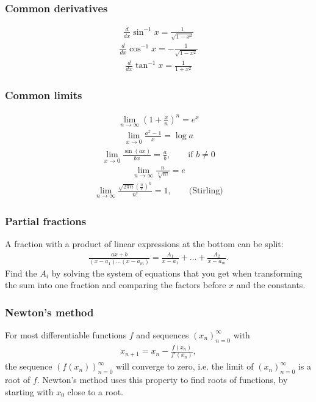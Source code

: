 \subsubsection{Common derivatives}
\begin{align*}
    \frac{d}{dx}\sin^{-1}x = \frac1{\sqrt{1-x^2}}
\end{align*}
\begin{align*}
    \frac{d}{dx}\cos^{-1}x = -\frac1{\sqrt{1-x^2}}
\end{align*}
\begin{align*}
    \frac{d}{dx}\tan^{-1}x = \frac1{1+x^2}
\end{align*}

\subsubsection{Common limits}
\begin{align*}
    \lim_{n\to\infty} \left(1 + \frac xn\right)^{n} = e^x
\end{align*}
\begin{align*}
    \lim_{x \to 0}\frac{a^x - 1}x = \log a
\end{align*}
\begin{align*}
    \lim_{x \to 0} \frac{\sin(ax)}{bx} = \frac ab, \qquad \text{if }b \neq 0
\end{align*}
\begin{align*}
    \lim_{n \to \infty} \frac n{\sqrt[n]{n!}} = e
\end{align*}
\begin{align*}
    \lim_{n \to \infty} \frac{\sqrt{2\pi n}\left(\frac ne\right)^n}{n!} = 1, \qquad \text{(Stirling)}
\end{align*}

\subsubsection{Partial fractions}
A fraction with a product of linear expressions at the bottom can be split:
\begin{align*}
    \frac{ax + b}{(x - a_1)\dots(x - a_m)} = \frac{A_1}{x - a_1} + \dots + \frac{A_2}{x - a_m}.
\end{align*}
Find the $A_i$ by solving the system of equations that you get when transforming the sum into one fraction and comparing the factors before $x$ and the constants.

\subsubsection{Newton's method}
For most differentiable functions $f$ and sequences $(x_n)_{n=0}^\infty$ with
\begin{align*}
    x_{n + 1} = x_n - \frac{f(x_n)}{f'(x_n)},
\end{align*}
the sequence $(f(x_n))_{n=0}^\infty$ will converge to zero, i.e. the limit of $(x_n)_{n=0}^\infty$ is a root of $f$. Newton's method uses this property to find roots of functions, by starting with $x_0$ close to a root.

